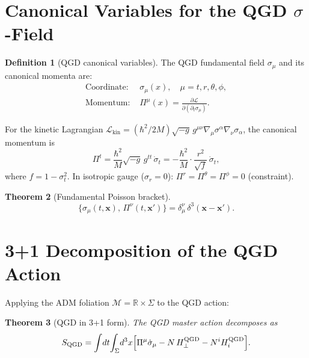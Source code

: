 \documentclass[11pt,a4paper]{article}
\theoremstyle{plain}
\newtheorem{theorem}{Theorem}[section]
\theoremstyle{definition}
\newtheorem{definition}[theorem]{Definition}
\theoremstyle{remark}
\newcommand{\Hperp}{H_\perp}
\newcommand{\Hi}{H_i}
\begin{document}
\section{Canonical Variables for the QGD $\sigma$-Field}
\label{sec:canonical}

\begin{definition}[QGD canonical variables]\label{def:canonical}
The QGD fundamental field $\sigma_\mu$ and its canonical momenta are:
\begin{align}
  \text{Coordinate: }&\sigma_\mu(x), \quad \mu = t,r,\theta,\phi,
  \label{eq:coord}\\
  \text{Momentum: }&\Pi^\mu(x) = \frac{\partial\mathcal{L}}{\partial(\partial_t\sigma_\mu)}.
  \label{eq:mom}
\end{align}
\end{definition}

For the kinetic Lagrangian $\mathcal{L}_{\mathrm{kin}} = (\hbar^2/2M)\sqrt{-g}\,g^{\mu\nu}\nabla_\mu\sigma^\alpha\nabla_\nu\sigma_\alpha$, the canonical momentum is
\begin{equation}
  \Pi^t = \frac{\hbar^2}{M}\sqrt{-g}\,g^{tt}\,\dot\sigma_t
        = -\frac{\hbar^2}{M}\cdot\frac{r^2}{\sqrt{f}}\,\dot\sigma_t,
  \label{eq:Pi_t}
\end{equation}
where $f = 1-\sigma_t^2$.  In isotropic gauge ($\sigma_r = 0$):
$\Pi^r = \Pi^\theta = \Pi^\phi = 0$ (constraint).

\begin{theorem}[Fundamental Poisson bracket]
\begin{equation}
  \{\sigma_\mu(t,\mathbf{x}),\,\Pi^\nu(t,\mathbf{x}')\}
  = \delta^\nu_\mu\,\delta^3(\mathbf{x}-\mathbf{x}').
  \label{eq:PB}
\end{equation}
\end{theorem}

\section{3+1 Decomposition of the QGD Action}
\label{sec:3plus1}

Applying the ADM foliation $\mathcal{M} = \mathbb{R}\times\Sigma$ to the QGD action:

\begin{theorem}[QGD in 3+1 form]\label{thm:3plus1}
The QGD master action decomposes as
\begin{equation}
  S_{\mathrm{QGD}} = \int\!dt\!\int_\Sigma\!d^3x
    \Bigl[\Pi^\mu\dot\sigma_\mu - N\,\Hperp^{\mathrm{QGD}} - N^i\Hi^{\mathrm{QGD}}\Bigr].
  \label{eq:S_3plus1}
\end{equation}
\end{theorem}
\end{document}
